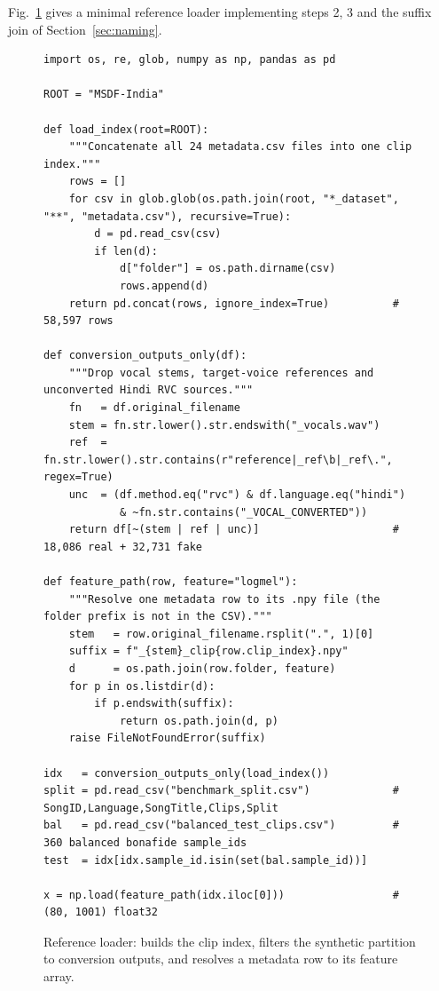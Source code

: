 \documentclass[conference]{IEEEtran}
\begin{document}
Fig.~\ref{fig:code} gives a minimal reference loader implementing steps 2, 3 and the
suffix join of Section~\ref{sec:naming}.

\begin{figure}[t]
\centering
\begin{scriptsize}
\begin{verbatim}
import os, re, glob, numpy as np, pandas as pd

ROOT = "MSDF-India"

def load_index(root=ROOT):
    """Concatenate all 24 metadata.csv files into one clip index."""
    rows = []
    for csv in glob.glob(os.path.join(root, "*_dataset", "**", "metadata.csv"), recursive=True):
        d = pd.read_csv(csv)
        if len(d):
            d["folder"] = os.path.dirname(csv)
            rows.append(d)
    return pd.concat(rows, ignore_index=True)          # 58,597 rows

def conversion_outputs_only(df):
    """Drop vocal stems, target-voice references and unconverted Hindi RVC sources."""
    fn   = df.original_filename
    stem = fn.str.lower().str.endswith("_vocals.wav")
    ref  = fn.str.lower().str.contains(r"reference|_ref\b|_ref\.", regex=True)
    unc  = (df.method.eq("rvc") & df.language.eq("hindi")
            & ~fn.str.contains("_VOCAL_CONVERTED"))
    return df[~(stem | ref | unc)]                     # 18,086 real + 32,731 fake

def feature_path(row, feature="logmel"):
    """Resolve one metadata row to its .npy file (the folder prefix is not in the CSV)."""
    stem   = row.original_filename.rsplit(".", 1)[0]
    suffix = f"_{stem}_clip{row.clip_index}.npy"
    d      = os.path.join(row.folder, feature)
    for p in os.listdir(d):
        if p.endswith(suffix):
            return os.path.join(d, p)
    raise FileNotFoundError(suffix)

idx   = conversion_outputs_only(load_index())
split = pd.read_csv("benchmark_split.csv")             # SongID,Language,SongTitle,Clips,Split
bal   = pd.read_csv("balanced_test_clips.csv")         # 360 balanced bonafide sample_ids
test  = idx[idx.sample_id.isin(set(bal.sample_id))]

x = np.load(feature_path(idx.iloc[0]))                 # (80, 1001) float32
\end{verbatim}
\end{scriptsize}
\caption{Reference loader: builds the clip index, filters the synthetic partition to
conversion outputs, and resolves a metadata row to its feature array.}
\label{fig:code}
\end{figure}
\end{document}
